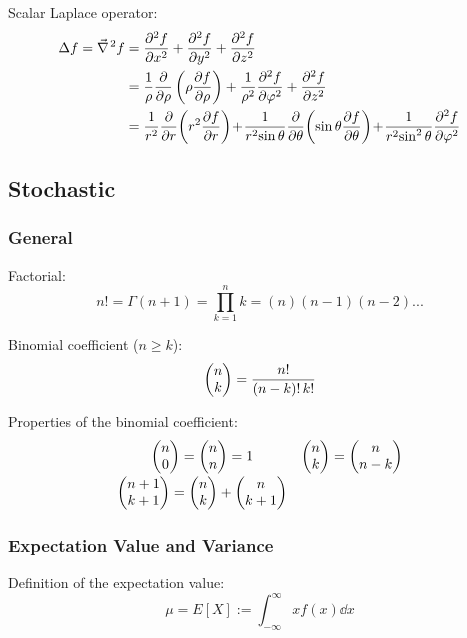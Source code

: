 			\noindent
			Scalar Laplace operator:
			\begin{equation}
				\begin{aligned}
					\Delta f = \Nabla^2 f &= \frac{\partial^2 f}{\partial x^2} + \frac{\partial^2 f}{\partial y^2} + \frac{\partial^2 f}{\partial z^2} \\
					&= \frac{1}{\rho} \frac{\partial}{\partial \rho}\left(\rho \frac{\partial f}{\partial \rho}\right)+ \frac{1}{\rho^2} \frac{\partial^2 f}{\partial \varphi^2}+ \frac{\partial^2 f}{\partial z^2} \\
					&= {\displaystyle \frac{1}{r^{2}} \frac{\partial }{\partial r}\!\left(r^{2}\frac{\partial f}{\partial r}\right)\!+\!\frac{1}{r^{2}\!\sin \theta } \frac{\partial }{\partial \theta }\!\left(\sin \theta \frac{\partial f}{\partial \theta }\right)\!+\!\frac{1}{r^{2}\!\sin ^{2}\theta }\frac{\partial ^{2}f}{\partial \varphi ^{2}}}
				\end{aligned}
			\end{equation}


	\subsection{Stochastic}
		\subsubsection{General}
			\noindent
			Factorial:
			\begin{equation}
				n!=\Gamma(n+1)=\prod_{k=1}^{n}k=(n)(n-1)(n-2)...
			\end{equation}

			\noindent
			Binomial coefficient ($n\ge k$):
			\begin{equation}
				\binomkoeff{n}{k} = \frac{n!}{\left(n-k\right)!\,k!}
			\end{equation}

			\noindent
			Properties of the binomial coefficient:
			\begin{equation}
				\begin{array}{cl}
					\binomkoeff{n}{0}=\binomkoeff{n}{n} = 1 & \binomkoeff{n}{k} = \binomkoeff{n}{n-k} \\ [8pt]
					\binomkoeff{n+1}{k+1}=\binomkoeff{n}{k}+\binomkoeff{n}{k+1}
				\end{array}
			\end{equation}

		\subsubsection{Expectation Value and Variance}
			\noindent
			Definition of the expectation value:
			\begin{equation}
				\mu = E\left[ X \right] := \int_{-\infty}^{\infty} xf(x)\dd{x}
			\end{equation}

